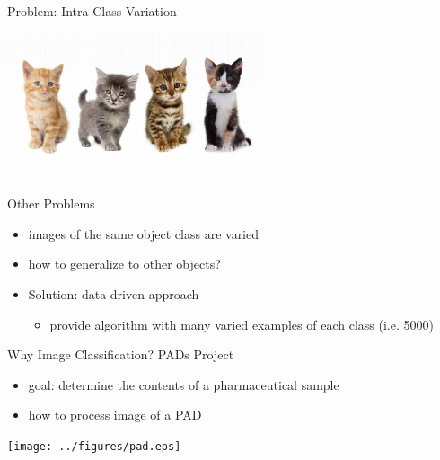 \documentclass{beamer}
\begin{document}
  \begin{frame}{Problem: Intra-Class Variation}
    \begin{center}
      \includegraphics[width=3in]{../figures/kitty_intra_class_variation.eps}
    \end{center}
  \end{frame}

  \begin{frame}{Other Problems}
    \begin{itemize}
      \item images of the same object class are varied
      \item how to generalize to other objects?
      \item Solution: data driven approach
      \begin{itemize}
        \item provide algorithm with many varied examples of each class (i.e. 5000)
      \end{itemize}
    \end{itemize}
  \end{frame}

  \begin{frame}{Why Image Classification?}
    PADs Project
    \begin{itemize}
      \item goal: determine the contents of a pharmaceutical sample
      \item how to process image of a PAD
    \end{itemize}
    \begin{center}
      \texttt{[image: ../figures/pad.eps]}
    \end{center}
  \end{frame}
\end{document}
